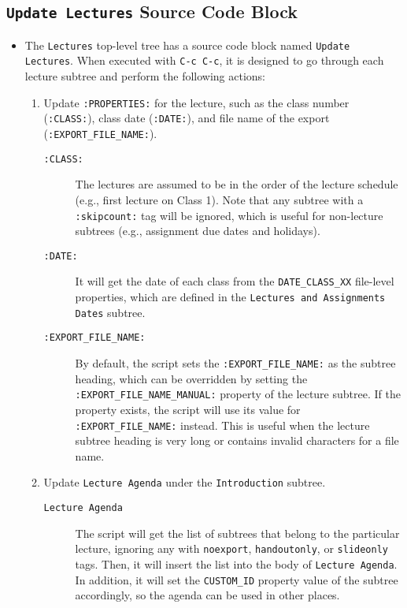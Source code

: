 \documentclass[10pt,article]{article}
\begin{document}
\subsection{\texttt{Update Lectures} Source Code Block}
\label{sec:org7b94c50}
\begin{itemize}
\item The \texttt{Lectures} top-level tree has a source code block named \texttt{Update
  Lectures}. When executed with \texttt{C-c C-c}, it is designed to go through
each lecture subtree and perform the following actions:

\begin{enumerate}
\item Update \texttt{:PROPERTIES:} for the lecture, such as the class number
(\texttt{:CLASS:}), class date (\texttt{:DATE:}), and file name of the export
(\texttt{:EXPORT\_FILE\_NAME:}).

\begin{description}
\item[{\texttt{:CLASS:}}] The lectures are assumed to be in the order of the
lecture schedule (e.g., first lecture on Class
1). Note that any subtree with a \texttt{:skipcount:} tag
will be ignored, which is useful for
non-lecture subtrees (e.g., assignment due dates
and holidays).
\item[{\texttt{:DATE:}}] It will get the date of each class from the \texttt{DATE\_CLASS\_XX} file-level
properties, which are defined in the \texttt{Lectures and
                   Assignments Dates} subtree.
\item[{\texttt{:EXPORT\_FILE\_NAME:}}] By default, the script sets the
\texttt{:EXPORT\_FILE\_NAME:} as the subtree heading, which can be
overridden by setting the \texttt{:EXPORT\_FILE\_NAME\_MANUAL:}
property of the lecture subtree. If the property exists, the
script will use its value for \texttt{:EXPORT\_FILE\_NAME:}
instead. This is useful when the lecture subtree heading is
very long or contains invalid characters for a file name.
\end{description}

\item Update \texttt{Lecture Agenda} under the \texttt{Introduction} subtree.

\begin{description}
\item[{\texttt{Lecture Agenda}}] The script will get the list of subtrees
that belong to the particular lecture, ignoring any with
\texttt{noexport}, \texttt{handoutonly}, or \texttt{slideonly} tags. Then, it
will insert the list into the body of \texttt{Lecture Agenda}. In
addition, it will set the \texttt{CUSTOM\_ID} property value of the
subtree accordingly, so the agenda can be used in other
places.
\end{description}


\end{enumerate}
\end{itemize}
\end{document}
